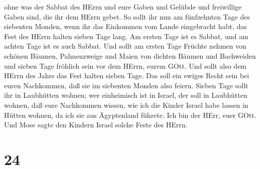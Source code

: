 ohne was der Sabbat des HErrn und eure Gaben und Gelübde
und freiwillige Gaben sind, die ihr dem HErrn gebet.  So
sollt ihr nun am fünfzehnten Tage des siebenten Monden, wenn ihr das
Einkommen vom Lande eingebracht habt, das Fest des HErrn halten sieben
Tage lang. Am ersten Tage ist es Sabbat, und am achten Tage ist es auch
Sabbat.  Und sollt am ersten Tage Früchte nehmen von
schönen Bäumen, Palmenzweige und Maien von dichten Bäumen und Bachweiden
und sieben Tage fröhlich sein vor dem HErrn, eurem GOtt. 
Und sollt also dem HErrn des Jahrs das Fest halten sieben Tage. Das soll
ein ewiges Recht sein bei euren Nachkommen, daß sie im siebenten Monden
also feiern.  Sieben Tage sollt ihr in Laubhütten wohnen;
wer einheimisch ist in Israel, der soll in Laubhütten wohnen,
 daß eure Nachkommen wissen, wie ich die Kinder Israel habe
lassen in Hütten wohnen, da ich sie aus Ägyptenland führete. Ich bin der
HErr, euer GOtt.  Und Mose sagte den Kindern Israel solche
Feste des HErrn.

\hypertarget{section-23}{%
\section{24}\label{section-23}}

